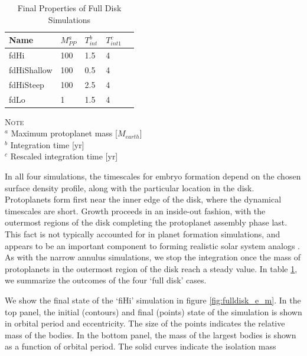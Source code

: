 \documentclass[twocolumn]{aastex63}
\begin{document}
\begin{table}
\caption{Final Properties of Full Disk Simulations}
\begin{tabular}{lllll} \hline \hline
Name     & $M_{PP}^a$ & $T_{int}^b$ & $T_{int 1}^c$ &  \\ \hline
fdHi                 & 100                                                         & 1.5                              & 4  &  \\
fdHiShallow     & 100                                                        & 0.5                              & 4  &  \\
fdHiSteep       & 100                                                         & 2.5                              & 4 &  \\
fdLo                & 1                                                             & 1.5                              & 4 &  \\ \hline
\end{tabular}
\label{tab:sim_properties}
\begin{flushleft}
\textsc{Note} \\ {$^a$ Maximum protoplanet mass [$M_{earth}$] \\
		       $^b$ Integration time [yr] \\
		       $^c$ Rescaled integration time [yr]} \\
\end{flushleft}
\end{table}

In all four simulations, the timescales for embryo formation depend on the chosen surface density profile, along with the particular location in the disk. Protoplanets form first near the inner edge of the disk, where the dynamical timescales are short. Growth proceeds in an inside-out fashion, with the outermost regions of the disk completing the protoplanet assembly phase last. This fact is not typically accounted for in planet formation simulations, and appears to be an important component to forming realistic solar system analogs \citep{clement20}. As with the narrow annulus simulations, we stop the integration once the mass of protoplanets in the outermost region of the disk reach a steady value. In table \ref{tab:sim_properties}, we summarize the outcomes of the four `full disk' cases.

We show the final state of the `fiHi' simulation in figure \ref{fig:fulldisk_e_m}. In the top panel, the initial (contours) and final (points) state of the simulation is shown in orbital period and eccentricity. The size of the points indicates the relative mass of the bodies. In the bottom panel, the mass of the largest bodies is shown as a function of orbital period. The solid curves indicate the isolation mass
\end{document}
